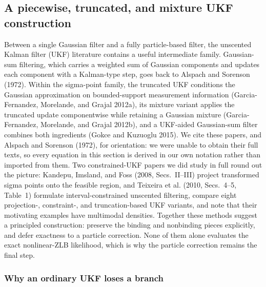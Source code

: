 \documentclass[11pt]{article}
\begin{document}
\subsection{A piecewise, truncated, and mixture UKF construction}
\label{sec:ukf}

Between a single Gaussian filter and a fully particle-based filter, the
unscented Kalman filter (UKF) literature contains a useful intermediate
family. Gaussian-sum filtering, which carries a weighted sum of Gaussian
components and updates each component with a Kalman-type step, goes back to
Alspach and Sorenson (1972). Within the sigma-point family, the truncated UKF
conditions the Gaussian approximation on bounded-support measurement
information (Garcia-Fernandez, Morelande, and Grajal 2012a), its mixture
variant applies the truncated update componentwise while retaining a Gaussian
mixture (Garcia-Fernandez, Morelande, and Grajal 2012b), and a UKF-aided
Gaussian-sum filter combines both ingredients (Gokce and Kuzuoglu 2015). We
cite these papers, and Alspach and Sorenson (1972), for orientation: we
were unable to obtain their full texts, so every equation in this section is
derived in our own notation rather than imported from them. Two
constrained-UKF papers we did study in full round out the picture: Kandepu,
Imsland, and Foss (2008, Secs.~II--III) project transformed sigma points onto
the feasible region, and Teixeira et al. (2010, Secs.~4--5, Table~1)
formulate interval-constrained unscented filtering, compare eight
projection-, constraint-, and truncation-based UKF variants, and note that
their motivating examples have multimodal densities. Together these methods
suggest a principled construction: preserve the binding and nonbinding
pieces explicitly, and defer exactness to a particle correction. None of
them alone evaluates the exact nonlinear-ZLB likelihood, which is why the
particle correction remains the final step.

\subsubsection{Why an ordinary UKF loses a branch}
\label{sec:ukf-branchloss}
\end{document}
